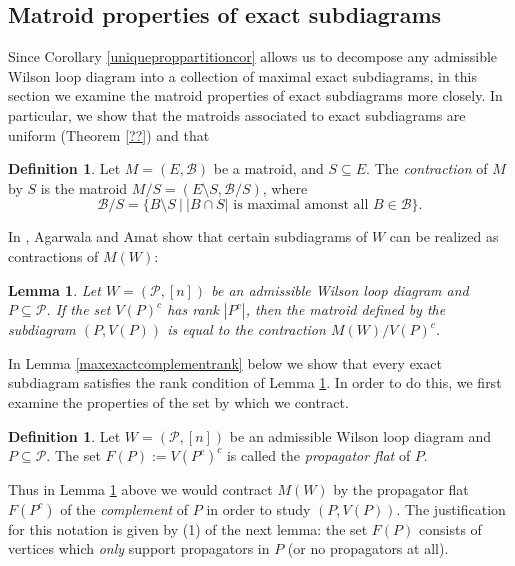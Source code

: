 \documentclass[11pt]{article}
\newcommand{\cP}{\mathcal{P}}
\newcommand{\cB}{\mathcal{B}}
\newtheorem{lem}[thm]{Lemma}
\theoremstyle{remark}
\theoremstyle{definition}
\newtheorem{dfn}[thm]{Definition}
\begin{document}
\subsection{Matroid properties of exact subdiagrams}

Since Corollary \ref{uniqueproppartitioncor} allows us to decompose any admissible Wilson loop diagram into a collection of maximal exact subdiagrams, in this section we examine the matroid properties of exact subdiagrams more closely. In particular, we show that the matroids associated to exact subdiagrams are uniform (Theorem \ref{??}) and that 

\begin{dfn}\label{matroid contraction}
Let $M = (E,\cB)$ be a matroid, and $S \subseteq E$. The {\em contraction} of $M$ by $S$ is the matroid $M/S = (E \setminus S, \cB / S)$, where
\[\cB / S = \{B \setminus S \ \big| \ |B\cap S | \text{ is maximal amonst all }B \in \cB\}.\]
\end{dfn}

In \cite{wilsonloop}, Agarwala and Amat show that certain subdiagrams of $W$ can be realized as contractions of $M(W)$:

\begin{lem} \label{contractsubdiaglem} \cite[Theorem 3.33]{wilsonloop} 
Let $W = (\cP, [n])$ be an admissible Wilson loop diagram and $P \subseteq \cP$. If the set $V(P)^c$ has rank $|P^c|$, then the matroid defined by the subdiagram $(P, V(P))$ is equal to the contraction $M(W)/V(P)^c$.
\end{lem}


In Lemma \ref{maxexactcomplementrank} below we show that every exact subdiagram satisfies the rank condition of Lemma \ref{contractsubdiaglem}. In order to do this, we first examine the properties of the set by which we contract.

\begin{dfn}\label{def prop flat} 
Let $W = (\cP,[n])$ be an admissible Wilson loop diagram and $P \subseteq \cP$. The set $F(P) := V(P^c)^c$ is called the {\em propagator flat} of $P$.
\end{dfn}
Thus in Lemma \ref{contractsubdiaglem} above we would contract $M(W)$ by the propagator flat $F(P^c)$ of the {\em complement} of $P$ in order to study $(P,V(P))$. The justification for this notation is given by (1) of the next lemma: the set $F(P)$ consists of vertices which {\em only} support propagators in $P$ (or no propagators at all).
\end{document}
